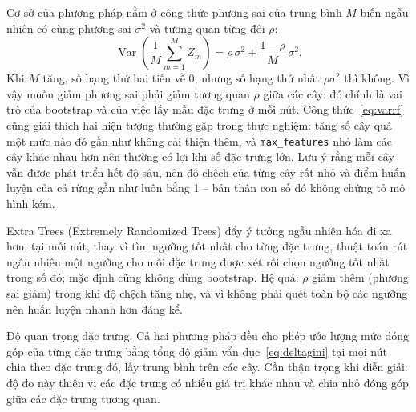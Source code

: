 \documentclass[12pt,a4paper,oneside]{report}
\begin{document}
Cơ sở của phương pháp nằm ở công thức phương sai của trung bình $M$ biến ngẫu
nhiên có cùng phương sai $\sigma^2$ và tương quan từng đôi $\rho$:
\begin{equation}
  \operatorname{Var}\!\left(\frac{1}{M}\sum_{m=1}^{M} Z_m\right)
  = \rho\,\sigma^{2} + \frac{1 - \rho}{M}\,\sigma^{2}.
  \label{eq:varrf}
\end{equation}
Khi $M$ tăng, số hạng thứ hai tiến về 0, nhưng số hạng thứ nhất
$\rho\sigma^{2}$ thì không. Vì vậy muốn giảm phương sai phải giảm tương
quan $\rho$ giữa các cây: đó chính là vai trò của bootstrap và của việc lấy
mẫu đặc trưng ở mỗi nút. Công thức~\eqref{eq:varrf} cũng giải thích hai hiện
tượng thường gặp trong thực nghiệm: tăng số cây
quá một mức nào đó gần như không cải thiện thêm, và \texttt{max\_features} nhỏ
làm các cây khác nhau hơn nên thường có lợi khi số đặc trưng lớn. Lưu ý rằng
mỗi cây vẫn được phát triển hết độ sâu, nên độ chệch của từng cây rất nhỏ và
điểm huấn luyện của cả rừng gần như luôn bằng 1 -- bản thân con số đó không
chứng tỏ mô hình kém.

Extra Trees (Extremely Randomized Trees) \cite{geurts2006} đẩy ý tưởng
ngẫu nhiên hóa đi xa hơn: tại mỗi nút, thay vì tìm ngưỡng tốt nhất cho từng đặc
trưng, thuật toán rút ngẫu nhiên một ngưỡng cho mỗi đặc trưng được xét
rồi chọn ngưỡng tốt nhất trong số đó; mặc định cũng không dùng bootstrap. Hệ
quả: $\rho$ giảm thêm (phương sai giảm) trong khi độ chệch tăng nhẹ, và vì không
phải quét toàn bộ các ngưỡng nên huấn luyện nhanh hơn đáng kể.

Độ quan trọng đặc trưng. Cả hai phương pháp đều cho phép ước lượng mức
đóng góp của từng đặc trưng bằng tổng độ giảm vẩn đục~\eqref{eq:deltagini} tại
mọi nút chia theo đặc trưng đó, lấy trung bình trên các cây. Cần thận trọng khi
diễn giải: độ đo này thiên vị các đặc trưng có nhiều giá trị khác nhau và chia
nhỏ đóng góp giữa các đặc trưng tương quan.
\end{document}
